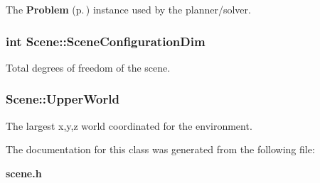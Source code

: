 The {\bf Problem} {\rm (p.\,\pageref{class_Problem})} instance used by the planner/solver.

\subsubsection{\setlength{\rightskip}{0pt plus 5cm}int Scene::Scene\-Configuration\-Dim}\label{class_Scene_m3}


Total degrees of freedom of the scene.

\subsubsection{ Scene::Upper\-World}\label{class_Scene_m5}


The largest x,y,z world coordinated for the environment.



The documentation for this class was generated from the following file:\begin{CompactItemize}
\item 
{\bf scene.h}\end{CompactItemize}
